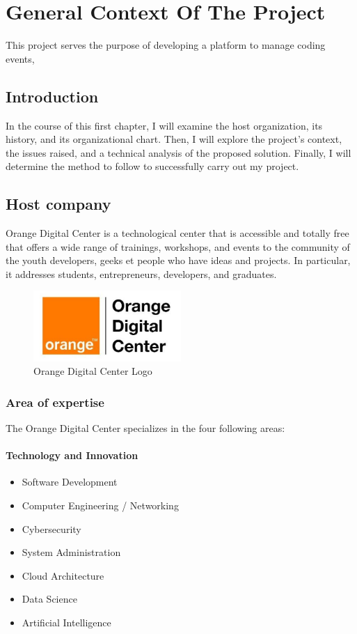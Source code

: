 \chapter{General Context Of The Project}
This project serves the purpose of developing a platform to manage coding
events,

\section{Introduction}
In the course of this first chapter, I will examine the host organization, its
history, and its organizational chart. Then, I will explore the project's
context, the issues raised, and a technical analysis of the proposed solution.
Finally, I will determine the method to follow to successfully carry out my
project.

\section{Host company}
Orange Digital Center\cite{OrangeDigitalCenter} is a technological center that
is accessible and totally
free
that offers a wide range of trainings, workshops, and events to the community
of the
youth developers, geeks et people who have ideas and projects. In particular,
it addresses
students, entrepreneurs, developers, and graduates.

\begin{figure}[h]
      \centering
      \includegraphics[width=0.5\textwidth]{../images/odc.png}
      \caption{Orange Digital Center Logo}
      \label{fig:Orange Digital Center Logo}
\end{figure}

\subsection{Area of expertise}
The Orange Digital Center specializes in the four following areas:
\subsubsection{Technology and Innovation}
\begin{itemize}
      \item Software Development
      \item Computer Engineering / Networking
      \item Cybersecurity
      \item System Administration
      \item Cloud Architecture
      \item Data Science
      \item Artificial Intelligence
\end{itemize}

